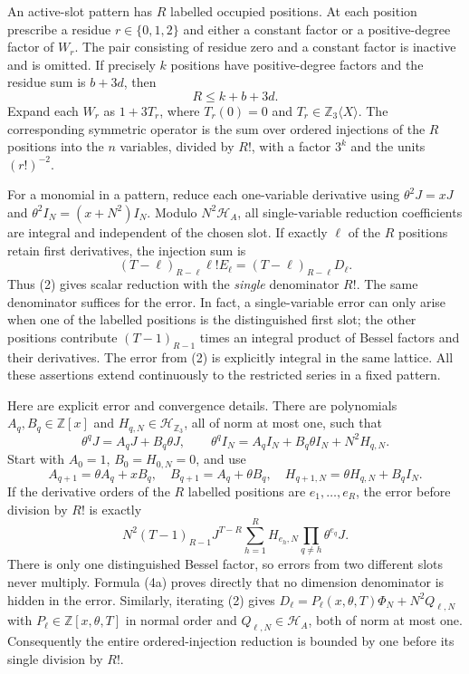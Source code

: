 \documentclass[11pt,a4paper]{article}
\theoremstyle{definition}\newtheorem{definition}[theorem]{Definition}
\theoremstyle{remark}\newtheorem{remark}[theorem]{Remark}
\numberwithin{equation}{section}
\begin{document}
An active-slot pattern has $R$ labelled occupied positions.  At each
position prescribe a residue $r\in\{0,1,2\}$ and either a constant
factor or a positive-degree factor of $W_r$.  The pair consisting of
residue zero and a constant factor is inactive and is omitted.
If precisely $k$ positions have positive-degree factors and the residue
sum is $b+3d$, then
\[
                        R\le k+b+3d.
\tag{3}
\]
Expand each $W_r$ as $1+3T_r$, where $T_r(0)=0$ and
$T_r\in\mathbb Z_3\langle X\rangle$.
The corresponding symmetric operator is the sum over ordered injections
of the $R$ positions into the $n$ variables, divided by $R!$, with a
factor $3^k$ and the units $(r!)^{-2}$.

For a monomial in a pattern, reduce each one-variable derivative using
$\theta^2J=xJ$ and $\theta^2I_N=(x+N^2)I_N$.  Modulo
$N^2\mathcal H_A$, all single-variable reduction coefficients are
integral and independent of the chosen slot.  If exactly $\ell$ of
the $R$ positions retain first derivatives, the injection sum is
\[
              (T-\ell)_{R-\ell}\ell!E_\ell
                 =(T-\ell)_{R-\ell}D_\ell.
\tag{4}
\]
Thus (2) gives scalar reduction with the \emph{single} denominator
$R!$.  The same denominator suffices for the error.  In fact, a
single-variable error can only arise when one of the labelled positions
is the distinguished first slot; the other positions contribute
$(T-1)_{R-1}$ times an integral product of Bessel factors and their
derivatives.  The error from (2) is explicitly integral in the same
lattice.  All these assertions extend continuously to the restricted
series in a fixed pattern.

Here are explicit error and convergence details.  There are polynomials
$A_q,B_q\in\mathbb Z[x]$ and $H_{q,N}\in\mathcal H_{\mathbb Z_3}$,
all of norm at most one, such that
\[
 \theta^qJ=A_qJ+B_q\theta J,\qquad
 \theta^qI_N=A_qI_N+B_q\theta I_N+N^2H_{q,N}.
\]
Start with $A_0=1$, $B_0=H_{0,N}=0$, and use
\[
 A_{q+1}=\theta A_q+xB_q,\quad
 B_{q+1}=A_q+\theta B_q,\quad
 H_{q+1,N}=\theta H_{q,N}+B_qI_N.
\]
If the derivative orders of the $R$ labelled positions are
$e_1,\ldots,e_R$, the error before division by $R!$ is exactly
\[
 N^2(T-1)_{R-1}J^{T-R}
       \sum_{h=1}^R H_{e_h,N}
                         \prod_{q\ne h}\theta^{e_q}J.
\tag{4a}
\]
There is only one distinguished Bessel factor, so errors from two
different slots never multiply.  Formula (4a) proves directly that
no dimension denominator is hidden in the error.
Similarly, iterating (2) gives
$D_\ell=P_\ell(x,\theta,T)\Phi_N+N^2Q_{\ell,N}$ with
$P_\ell\in\mathbb Z[x,\theta,T]$ in normal order and
$Q_{\ell,N}\in\mathcal H_A$, both of norm at most one.
Consequently the entire ordered-injection reduction is bounded by one
before its single division by $R!$.
\end{document}
